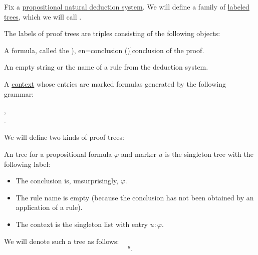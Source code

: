 \begin{definition}\label{def:natural_deduction_proof_tree}\mimprovised
  Fix a \hyperref[def:abstract_propositional_natural_deduction_system]{propositional natural deduction system}. We will define a family of \hyperref[def:labeled_tree]{labeled trees}, which we will call .

  The labels of proof trees are triples consisting of the following objects:
  \begin{thmenum}[series=def:natural_deduction_proof_tree]
     A formula, called the \term[ru=conclusion (\cite[35]{TroelstraSchwichtenberg2000Proofs}), en=conclusion (\cite[36]{TroelstraSchwichtenberg2000Proofs})]{conclusion} of the proof.

     An empty string or the name of a rule from the deduction system.

     A \hyperref[def:logical_context]{context} whose entries are marked formulas generated by the following grammar:
    \begin{bnf*}
                {}, \\
        { \bnfsp \bnftsq{:} \bnfsp {}}.
    \end{bnf*}
  \end{thmenum}

  We will define two kinds of proof trees:
  \begin{thmenum}[resume=def:natural_deduction_proof_tree]
     An  tree for a propositional formula \( \varphi \) and marker \( u \) is the singleton tree with the following label:
    \begin{itemize}
      \item The conclusion is, unsurprisingly, \( \varphi \).
      \item The rule name is empty (because the conclusion has not been obtained by an application of a rule).
      \item The context is the singleton list with entry \( u: \varphi \).
    \end{itemize}

    We will denote such a tree as follows:
    \begin{equation*}
      [\varphi]^u.
    \end{equation*}


\end{thmenum}
\end{definition}
